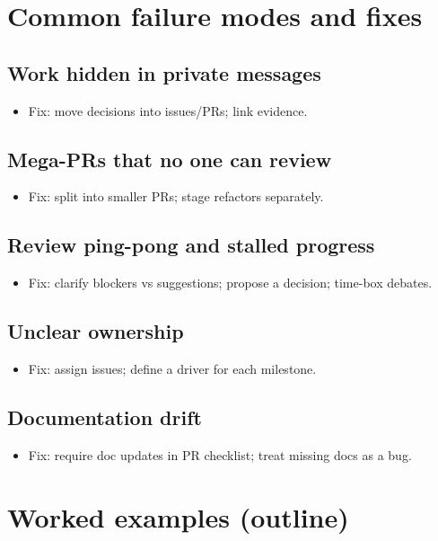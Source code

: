 \section{Common failure modes and fixes}
\subsection{Work hidden in private messages}
\begin{itemize}
\item Fix: move decisions into issues/PRs; link evidence.
\end{itemize}

\subsection{Mega-PRs that no one can review}
\begin{itemize}
\item Fix: split into smaller PRs; stage refactors separately.
\end{itemize}

\subsection{Review ping-pong and stalled progress}
\begin{itemize}
\item Fix: clarify blockers vs suggestions; propose a decision; time-box debates.
\end{itemize}

\subsection{Unclear ownership}
\begin{itemize}
\item Fix: assign issues; define a driver for each milestone.
\end{itemize}

\subsection{Documentation drift}
\begin{itemize}
\item Fix: require doc updates in PR checklist; treat missing docs as a bug.
\end{itemize}

\section{Worked examples (outline)}
